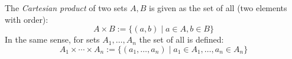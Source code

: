 \begin{Definition}
 The \emph{Cartesian product} of two sets $A,B$ is
 given as the set of all  (two elements with order):
 	$$
 		A \times B
 		:=  \{ (a,b) \mid a \in A, b \in B\}
 	$$
 In the same sense, for sets $A_1, \ldots, A_n$
 the set of all  is defined:
  	$$
 		A_1 \times \cdots \times
 		A_n
 		:=  \{ (a_1,\ldots, a_n) \mid a_1 \in A_1, \ldots, a_n \in A_n\}
 	$$
\end{Definition}
